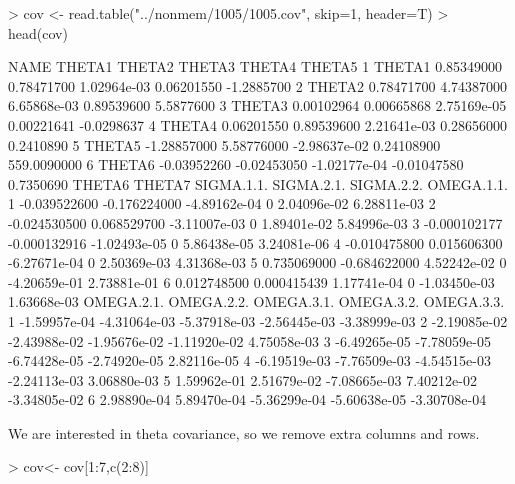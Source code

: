 \begin{Schunk}
\begin{Sinput}
> cov <- read.table("../nonmem/1005/1005.cov", skip=1, header=T)
> head(cov)
\end{Sinput}
\begin{Soutput}
    NAME      THETA1      THETA2       THETA3      THETA4      THETA5
1 THETA1  0.85349000  0.78471700  1.02964e-03  0.06201550  -1.2885700
2 THETA2  0.78471700  4.74387000  6.65868e-03  0.89539600   5.5877600
3 THETA3  0.00102964  0.00665868  2.75169e-05  0.00221641  -0.0298637
4 THETA4  0.06201550  0.89539600  2.21641e-03  0.28656000   0.2410890
5 THETA5 -1.28857000  5.58776000 -2.98637e-02  0.24108900 559.0090000
6 THETA6 -0.03952260 -0.02453050 -1.02177e-04 -0.01047580   0.7350690
        THETA6       THETA7   SIGMA.1.1. SIGMA.2.1.   SIGMA.2.2.  OMEGA.1.1.
1 -0.039522600 -0.176224000 -4.89162e-04          0  2.04096e-02 6.28811e-03
2 -0.024530500  0.068529700 -3.11007e-03          0  1.89401e-02 5.84996e-03
3 -0.000102177 -0.000132916 -1.02493e-05          0  5.86438e-05 3.24081e-06
4 -0.010475800  0.015606300 -6.27671e-04          0  2.50369e-03 4.31368e-03
5  0.735069000 -0.684622000  4.52242e-02          0 -4.20659e-01 2.73881e-01
6  0.012748500  0.000415439  1.17741e-04          0 -1.03450e-03 1.63668e-03
    OMEGA.2.1.   OMEGA.2.2.   OMEGA.3.1.   OMEGA.3.2.   OMEGA.3.3.
1 -1.59957e-04 -4.31064e-03 -5.37918e-03 -2.56445e-03 -3.38999e-03
2 -2.19085e-02 -2.43988e-02 -1.95676e-02 -1.11920e-02  4.75058e-03
3 -6.49265e-05 -7.78059e-05 -6.74428e-05 -2.74920e-05  2.82116e-05
4 -6.19519e-03 -7.76509e-03 -4.54515e-03 -2.24113e-03  3.06880e-03
5  1.59962e-01  2.51679e-02 -7.08665e-03  7.40212e-02 -3.34805e-02
6  2.98890e-04  5.89470e-04 -5.36299e-04 -5.60638e-05 -3.30708e-04
\end{Soutput}
\end{Schunk}
We are interested in theta covariance, so we remove extra columns and rows.
\begin{Schunk}
\begin{Sinput}
> cov<- cov[1:7,c(2:8)]
\end{Sinput}
\end{Schunk}
